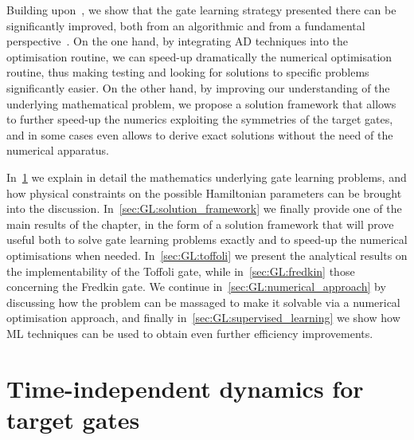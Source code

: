Building upon~\cite{banchi2016quantum}, we show that the gate learning strategy presented there can be significantly improved, both from an algorithmic and from a fundamental perspective~\cite{innocenti2018supervised}.
On the one hand, by integrating \ac{AD} techniques into the optimisation routine, we can speed-up dramatically the numerical optimisation routine, thus making testing and looking for solutions to specific problems significantly easier.
On the other hand, by improving our understanding of the underlying mathematical problem, we propose a solution framework that allows to further speed-up the numerics exploiting the symmetries of the target gates, and in some cases even allows to derive exact solutions without the need of the numerical apparatus.

In~\cref{sec:GL:problem_details} we explain in detail the mathematics underlying gate learning problems, and how physical constraints on the possible Hamiltonian parameters can be brought into the discussion. In~\cref{sec:GL:solution_framework} we finally provide one of the main results of the chapter, in the form of a solution framework that will prove useful both to solve gate learning problems exactly and to speed-up the numerical optimisations when needed. In~\cref{sec:GL:toffoli} we present the analytical results on the implementability of the Toffoli gate, while in~\cref{sec:GL:fredkin} those concerning the Fredkin gate. We continue in~\cref{sec:GL:numerical_approach} by discussing how the problem can be massaged to make it solvable via a numerical optimisation approach, and finally in~\cref{sec:GL:supervised_learning} we show how \ac{ML} techniques can be used to obtain even further efficiency improvements.


\section{Time-independent dynamics for target gates}
\label{sec:GL:problem_details}

\newcommand{\setOfHamiltonians}{\calH[\bullet]}

